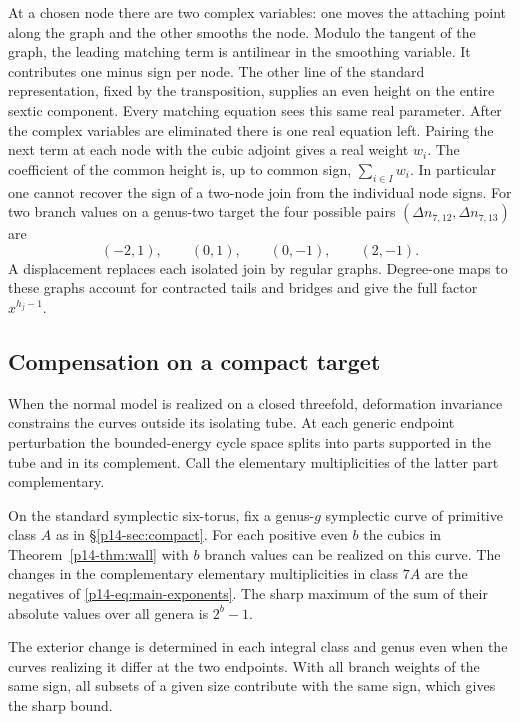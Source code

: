 At a chosen node there are two complex variables: one moves the
attaching point along the graph and the other smooths the node.
Modulo the tangent of the graph, the leading matching term is
antilinear in the smoothing variable. It contributes one minus sign
per node. The other line of the standard representation, fixed by the
transposition, supplies an even height on the entire sextic component.
Every matching equation sees this same real parameter. After the
complex variables are eliminated there is one real equation left.
Pairing the next term at each node with the cubic adjoint gives a real
weight \(w_i\). The coefficient of the common height is, up to common
sign, \(\sum_{i\in I}w_i\). In particular one cannot recover the sign
of a two-node join from the individual node signs. For two branch
values on a genus-two target the four possible pairs
\((\Delta n_{7,12},\Delta n_{7,13})\) are
\[
             (-2,1),\qquad (0,1),\qquad (0,-1),\qquad (2,-1).
\]
A displacement replaces each isolated join by regular graphs.
Degree-one maps to these graphs account for contracted tails and bridges
and give the full factor \(x^{h_j-1}\).

\subsection{Compensation on a compact target}
When the normal model is realized on a closed threefold, deformation
invariance constrains the curves outside its isolating tube. At each
generic endpoint perturbation the bounded-energy cycle space splits
into parts supported in the tube and in its complement. Call the
elementary multiplicities of the latter part complementary.
\begin{theorem}\label{p14-thm:torus}
On the standard symplectic six-torus, fix a genus-\(g\) symplectic
curve of primitive class \(A\) as in \S\ref{p14-sec:compact}. For each
positive even \(b\) the cubics in Theorem~\ref{p14-thm:wall} with \(b\)
branch values can be realized on this curve. The changes in the
complementary elementary multiplicities in class \(7A\) are the
negatives of \eqref{p14-eq:main-exponents}. The sharp maximum of the sum
of their absolute values over all genera is \(2^b-1\).
\end{theorem}


The exterior change is determined in each integral class and genus
even when the curves realizing it differ at the two endpoints. With
all branch weights of the same sign, all subsets of a given size
contribute with the same sign, which gives the sharp bound.

